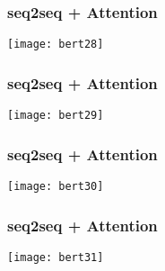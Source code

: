 






\begin{frame}[fragile]\frametitle{seq2seq + Attention}

\begin{center}
\texttt{[image: bert28]}
\end{center}	

\end{frame}

\begin{frame}[fragile]\frametitle{seq2seq + Attention}

\begin{center}
\texttt{[image: bert29]}
\end{center}	

\end{frame}

\begin{frame}[fragile]\frametitle{seq2seq + Attention}

\begin{center}
\texttt{[image: bert30]}
\end{center}	

\end{frame}

\begin{frame}[fragile]\frametitle{seq2seq + Attention}

\begin{center}
\texttt{[image: bert31]}
\end{center}	

\end{frame}

